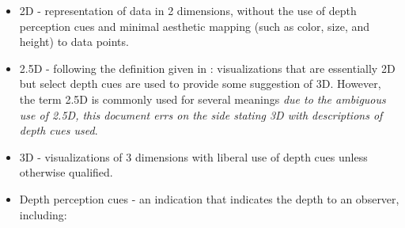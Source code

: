 \documentclass{monashthesis}
\begin{document}
\begin{itemize}
\tightlist
\item
  2D - representation of data in 2 dimensions, without the use of depth perception cues and minimal aesthetic mapping (such as color, size, and height) to data points.
\item
  2.5D - following the definition given in \textcite{ware_designing_2000}: visualizations that are essentially 2D but select depth cues are used to provide some suggestion of 3D. However, the term 2.5D is commonly used for several meanings \emph{due to the ambiguous use of 2.5D, this document errs on the side stating 3D with descriptions of depth cues used}.
\item
  3D - visualizations of 3 dimensions with liberal use of depth cues unless otherwise qualified.
\item
  Depth perception cues - an indication that indicates the depth to an observer, including:


\end{itemize}
\end{document}

